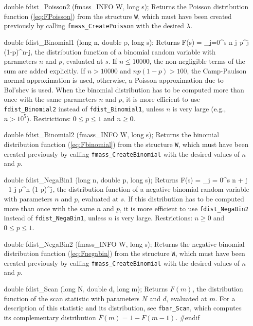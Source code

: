 double fdist_Poisson2 (fmass_INFO W, long s);
\endcode
 \tab  Returns the Poisson distribution function (\ref{eq:FPoisson})
  from the structure {\tt W}, which must have been created previously
  by calling {\tt fmass\_CreatePoisson} with the desired $\lambda$.
 \endtab
\code


double fdist_Binomial1 (long n, double p, long s);
\endcode
  \tab  Returns
  \eq
    F(s) = \sum_{j=0}^s {n \choose j}\; p^j (1-p)^{n-j},
  \endeq
  the distribution function of a binomial random variable with parameters
  $n$ and $p$, evaluated at $s$.
\ifdetailed
  If $n \le 10000$, the non-negligible terms of the sum are
  added explicitly.
  If $n > 10000$ and $np(1-p) > 100$, the Camp-Paulson normal
  approximation \cite{tCAM51a,tMOL70a} is used, otherwise, a Poisson
  approximation due to Bol'shev \cite{tBOL64a,tMOL70a} is used.
\fi
  When the binomial distribution has to be computed more than
  once with the same parameters $n$ and $p$, it is more efficient to use
  {\tt fdist\_Binomial2} instead of {\tt fdist\_Binomial1},
  unless $n$ is very large (e.g., $n > 10^5$).
  Restrictions: $0 \le p \le 1$ and $n \ge 0$.
 \endtab
\code


double fdist_Binomial2 (fmass_INFO W, long s);
\endcode
 \tab  Returns the binomial distribution function (\ref{eq:Fbinomial})
  from the structure {\tt W}, which must have been created previously
  by calling {\tt fmass\_CreateBinomial} with the desired values of
  $n$ and $p$.
 \endtab
\code


double fdist_NegaBin1 (long n, double p, long s);
\endcode
  \tab Returns
  \eq
   F(s) = \sum_{j = 0}^s {n + j - 1 \choose j} p^n (1-p)^{j},
  \endeq
  the distribution function of a negative binomial random variable with
  parameters $n$ and $p$, evaluated at $s$.
  If this distribution has to be computed more than
  once with the same $n$ and $p$, it is more efficient to use
  {\tt fdist\_NegaBin2} instead of {\tt fdist\_NegaBin1},
  unless $n$ is very large.
  Restrictions: $n \ge 0$ and $0 \le p \le 1$.
 \endtab
\code


double fdist_NegaBin2 (fmass_INFO W, long s);
\endcode
 \tab  Returns the negative binomial distribution function
  (\ref{eq:Fnegabin}) from the structure {\tt W},
  which must have been created previously
  by calling {\tt fmass\_CreateBinomial} with the desired values of
  $n$ and $p$.
 \endtab
\code


double fdist_Scan (long N, double d, long m);
\endcode
 \tab Returns $F(m)$, the distribution function of the scan statistic
  with parameters $N$ and $d$, evaluated at $m$.
  For a description of this statistic and its distribution, see
  {\tt fbar\_Scan}, which computes its complementary distribution
  $\bar F(m) = 1 - F(m-1)$.
 \endtab
\code
\hide
#endif
\endhide
\endcode
